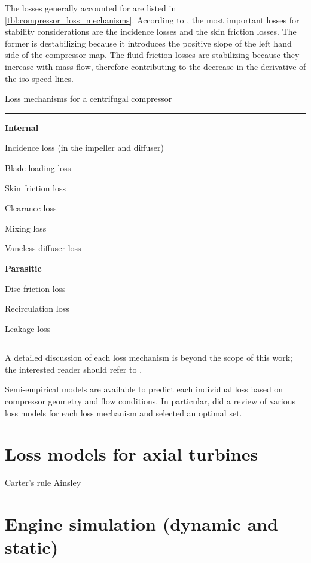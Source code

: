 \documentclass[tcc]{subfiles}
\begin{document}
The losses generally accounted for are listed in \cref{tbl:compressor_loss_mechanisms}. According to \textcite{Gravdahl2004,Gravdahl1999,Ferguson1963,Watson1982}, the most important losses for stability considerations are the incidence losses and the skin friction losses. The former is destabilizing because it introduces the positive slope of the left hand side of the compressor map. The fluid friction losses are stabilizing because they increase with mass flow, therefore contributing to the decrease in the derivative of the iso-speed lines.
\begin{table}
\caption{Loss mechanisms for a centrifugal compressor}
\label{tbl:compressor_loss_mechanisms}
\hrule
\begin{multicols}{2}
\begin{compactitem}
    \item[] \textbf{Internal}
    \item Incidence loss (in the impeller and diffuser)
    \item Blade loading loss
    \item Skin friction loss
    \item Clearance loss
    \item Mixing loss
    \item Vaneless diffuser loss
    \columnbreak
    \item[] \textbf{Parasitic}
    \item Disc friction loss
    \item Recirculation loss
    \item Leakage loss
\end{compactitem}
\end{multicols}
\hrule
{}
\end{table}

A detailed discussion of each loss mechanism is beyond the scope of this work; 
the interested reader should refer to \textcite{Cumpsty2004}. 

Semi-empirical models are available to predict each individual loss based on compressor geometry and flow conditions. 
In particular, \textcite{Oh1997} did a review of various loss models for each loss mechanism and selected an optimal set.

\section{Loss models for axial turbines}
Carter's rule
Ainsley

\section{Engine simulation (dynamic and static)}
\end{document}
